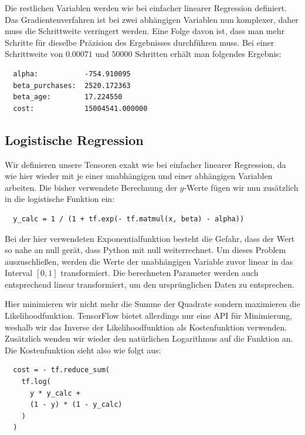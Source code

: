 Die restlichen Variablen werden wie bei einfacher linearer Regression definiert. Das Gradientenverfahren ist bei zwei abhängigen Variablen nun komplexer, daher muss die Schrittweite verringert werden. Eine Folge davon ist, dass man mehr Schritte für dieselbe Präzision des Ergebnisses durchführen muss. Bei einer Schrittweite von $0.00071$ und $50000$ Schritten erhält man folgendes Ergebnis:

\begin{verbatim}
  alpha:           -754.910095
  beta_purchases:  2520.172363
  beta_age:        17.224550
  cost:            15004541.000000
\end{verbatim}

\subsection{Logistische Regression}
\label{subsection:3:3:4}

Wir definieren unsere Tensoren exakt wie bei einfacher linearer Regression, da wie hier wieder mit je einer unabhängigen und einer abhängigen Variablen arbeiten. Die bisher verwendete Berechnung der $y$-Werte fügen wir nun zusätzlich in die logistische Funktion ein:

\begin{verbatim}
  y_calc = 1 / (1 + tf.exp(- tf.matmul(x, beta) - alpha))
\end{verbatim}

Bei der hier verwendeten Exponentialfunktion besteht die Gefahr, dass der Wert so nahe an null gerät, dass Python mit null weiterrechnet. Um dieses Problem auszuschließen, werden die Werte der unabhängigen Variable zuvor linear in das Interval $[0, 1]$ transformiert. Die berechneten Parameter werden auch entsprechend linear transformiert, um den ursprünglichen Daten zu entsprechen.

Hier minimieren wir nicht mehr die Summe der Quadrate sondern maximieren die Likelihoodfunktion. TensorFlow bietet allerdings nur eine API für Minimierung, weshalb wir das Inverse der Likelihoodfunktion als Kostenfunktion verwenden. Zusätzlich wenden wir wieder den natürlichen Logarithmus auf die Funktion an. Die Kostenfunktion sieht also wie folgt aus:

\begin{verbatim}
  cost = - tf.reduce_sum(
    tf.log(
      y * y_calc +
      (1 - y) * (1 - y_calc)
    )
  )
\end{verbatim}

